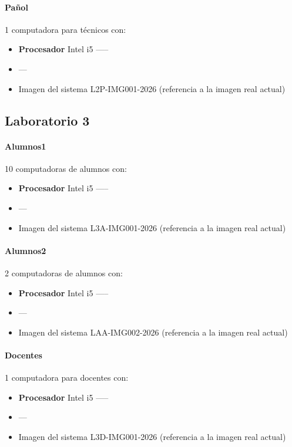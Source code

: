\paragraph{Pañol} 1 computadora para técnicos con:
\begin{itemize}
    \item \textbf{Procesador} Intel i5 -----
    \item ---
    \item Imagen del sistema L2P-IMG001-2026 (referencia a la imagen real actual)
\end{itemize}

\subsection{Laboratorio 3}
\paragraph{Alumnos1} 10 computadoras de alumnos con:
\begin{itemize}
    \item \textbf{Procesador} Intel i5 -----
    \item ---
    \item Imagen del sistema L3A-IMG001-2026 (referencia a la imagen real actual)
\end{itemize}

\paragraph{Alumnos2} 2 computadoras de alumnos con:
\begin{itemize}
    \item \textbf{Procesador} Intel i5 -----
    \item ---
    \item Imagen del sistema LAA-IMG002-2026 (referencia a la imagen real actual)
\end{itemize}

\paragraph{Docentes} 1 computadora para docentes con:
\begin{itemize}
    \item \textbf{Procesador} Intel i5 -----
    \item ---
    \item Imagen del sistema L3D-IMG001-2026 (referencia a la imagen real actual)
\end{itemize}

